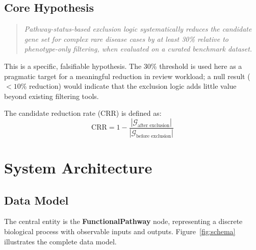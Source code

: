 \documentclass[12pt,a4paper]{article}
\begin{document}
\subsection{Core Hypothesis}

\begin{quote}
\emph{Pathway-status-based exclusion logic systematically reduces the candidate gene set for complex rare disease cases by at least 30\% relative to phenotype-only filtering, when evaluated on a curated benchmark dataset.}
\end{quote}

This is a specific, falsifiable hypothesis. The 30\% threshold is used here as a pragmatic target for a meaningful reduction in review workload; a null result ($<10\%$ reduction) would indicate that the exclusion logic adds little value beyond existing filtering tools.

The candidate reduction rate (CRR) is defined as:
\begin{equation}
\label{eq:crr}
    \text{CRR} = 1 - \frac{|\mathcal{G}_{\text{after exclusion}}|}{|\mathcal{G}_{\text{before exclusion}}|}
\end{equation}

\section{System Architecture}
\label{sec:architecture}

\subsection{Data Model}
\label{sec:datamodel}

The central entity is the \textbf{FunctionalPathway} node, representing a discrete biological process with observable inputs and outputs. Figure~\ref{fig:schema} illustrates the complete data model.
\end{document}
